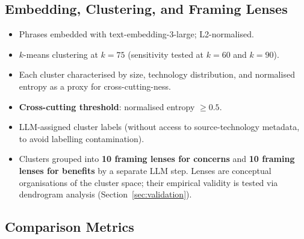 \documentclass[11pt, a4paper]{article}
\begin{document}
\subsection{Embedding, Clustering, and Framing Lenses}

\begin{itemize}
\item Phrases embedded with text-embedding-3-large; L2-normalised.
\item $k$-means clustering at $k=75$ (sensitivity tested at $k=60$ and
      $k=90$).
\item Each cluster characterised by size, technology distribution, and
      normalised entropy as a proxy for cross-cutting-ness.
\item \textbf{Cross-cutting threshold}: normalised entropy $\geq 0.5$.
\item LLM-assigned cluster labels (without access to source-technology
      metadata, to avoid labelling contamination).
\item Clusters grouped into \textbf{10 framing lenses for concerns} and
      \textbf{10 framing lenses for benefits} by a separate LLM step.
      Lenses are conceptual organisations of the cluster space; their
      empirical validity is tested via dendrogram analysis
      (Section~\ref{sec:validation}).
\end{itemize}

\subsection{Comparison Metrics}
\end{document}
